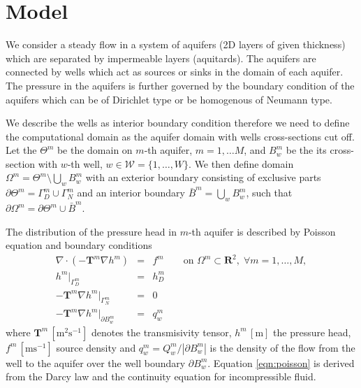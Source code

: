 \documentclass[preprint,12pt,authoryear]{elsarticle}
\newcommand{\R}{\mathbf{R}}
\begin{document}
\section{Model}
\label{sec:model}
We consider a steady flow in a system of aquifers (2D layers of given thickness) which are separated by 
impermeable layers (aquitards). The aquifers are connected by wells which act as sources
or sinks in the domain of each aquifer. The pressure in the aquifers is further governed by the boundary 
condition of the aquifers which can be of Dirichlet type or be homogenous of Neumann type.

We describe the wells as interior boundary condition therefore we need to define the computational domain
as the aquifer domain with wells cross-sections cut off. Let the $\Theta^m$ be the domain on $m$-th aquifer,
$m=1,\ldots M$, and $B^m_w$ be the its cross-section with $w$-th well, $w\in\mathcal{W}=\{1,\ldots,W\}$. 
We then define domain $\Omega^m = \Theta^m\setminus\bigcup\limits_{w}B^m_w$ with an exterior boundary 
consisting of exclusive parts $\partial\Theta^m=\Gamma^m_D\cup\Gamma^m_N$ and an interior boundary 
$\bar B^m=\bigcup\limits_{w}B^m_w$, such that $\partial\Omega^m=\partial\Theta^m\cup\bar B^m$.

The distribution of the pressure head in $m$-th aquifer is described by Poisson equation and 
boundary conditions
\begin{eqnarray} \label{eqn:poisson}
\nabla\cdot(-\mathbf{T}^m\nabla h^m) &=& f^m \qquad \textrm{on } \Omega^m\subset\R^2,\; \forall m=1,\dots,M, \\
h^m|_{\Gamma^m_D} &=& h^m_D \\
-\mathbf{T}^m\nabla h^m|_{\Gamma^m_N} &=& 0 \\
-\mathbf{T}^m\nabla h^m|_{\partial B^m_w} &=& q^m_w 
\end{eqnarray}
where $\mathbf{T}^m\, [\textrm{m}^2\textrm{s}^{-1}]$ denotes the transmisivity tensor,
$h^m\, [\textrm{m}]$ the pressure head, $f^m\, [\textrm{m}\textrm{s}^{-1}]$ source density and
$q^m_w = Q^m_w/|\partial B^m_w|$ is the density of the flow from the well to the aquifer over the well boundary 
$\partial B^m_w$. Equation \eqref{eqn:poisson} is derived from the Darcy law and the continuity equation 
for incompressible fluid.
\end{document}
